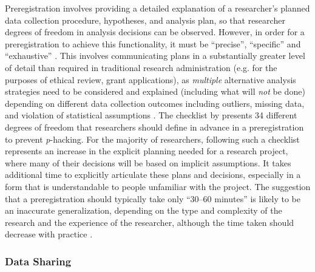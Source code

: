 \documentclass[meta, authordate]{jote-new-article}
\begin{document}
Preregistration involves providing a detailed explanation of a researcher’s planned data collection procedure, hypotheses, and analysis plan, so that researcher degrees of freedom in analysis decisions can be observed. However, in order for a preregistration to achieve this functionality, it must be “precise”, “specific” and “exhaustive” \parencites{Bakker2020}. This involves communicating plans in a substantially greater level of detail than required in traditional research administration (e.g. for the purposes of ethical review, grant applications), as \emph{multiple }alternative analysis strategies need to be considered and explained (including what will \emph{not }be done) depending on different data collection outcomes including outliers, missing data, and violation of statistical assumptions \parencites{Bakker2020}. The checklist by \textcite{Wicherts2016} presents 34 different degrees of freedom that researchers should define in advance in a preregistration to prevent \emph{p}-hacking. For the majority of researchers, following such a checklist represents an increase in the explicit planning needed for a research project, where many of their decisions will be based on implicit assumptions. It takes additional time to explicitly articulate these plans and decisions, especially in a form that is understandable to people unfamiliar with the project. The suggestion that a preregistration should typically take only “30–60 minutes” \parencites{Aguinis2020} is likely to be an inaccurate generalization, depending on the type and complexity of the research and the experience of the researcher, although the time taken should decrease with practice \parencites{Nosek2019}.



\subsubsection{Data Sharing}
\end{document}
